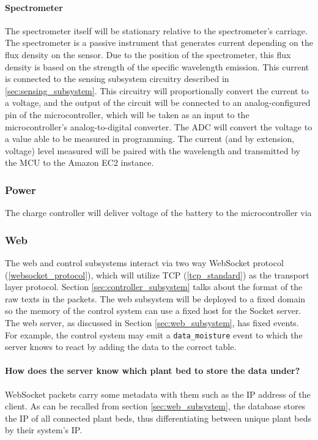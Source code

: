 \paragraph{Spectrometer} The spectrometer itself will be stationary relative to the spectrometer's carriage. The spectrometer is a passive instrument that generates current depending on the flux density on the sensor. Due to the position of the spectrometer, this flux density is based on the strength of the specific wavelength emission. This current is connected to the sensing subsystem circuitry described in \ref{sec:sensing_subsystem}. This circuitry will proportionally convert the current to a voltage, and the output of the circuit will be connected to an analog-configured pin of the microcontroller, which will be taken as an input to the microcontroller's analog-to-digital converter. The ADC will convert the voltage to a value able to be measured in programming. The current (and by extension, voltage) level measured will be paired with the wavelength and transmitted by the MCU to the Amazon EC2 instance.

\subsubsection{Power} The charge controller will deliver voltage of the battery to the microcontroller via

\subsubsection{Web}
The web and control subsystems interact via two way WebSocket protocol (\ref{websocket_protocol}), which will utilize TCP (\ref{tcp_standard}) as the transport layer protocol. Section \ref{sec:controller_subsystem} talks about the format of the raw texts in the packets. The web subsystem will be deployed to a fixed domain so the memory of the control system can use a fixed host for the Socket server. The web server, as discussed in Section \ref{sec:web_subsystem}, has fixed events. For example, the control system may emit a \texttt{data\_moisture} event to which the server knows to react by adding the data to the correct table.

\paragraph{How does the server know which plant bed to store the data under?}
WebSocket packets carry some metadata with them such as the IP address of the client. As can be recalled from section \ref{sec:web_subsystem}, the database stores the IP of all connected plant beds, thus differentiating between unique plant beds by their system's IP.